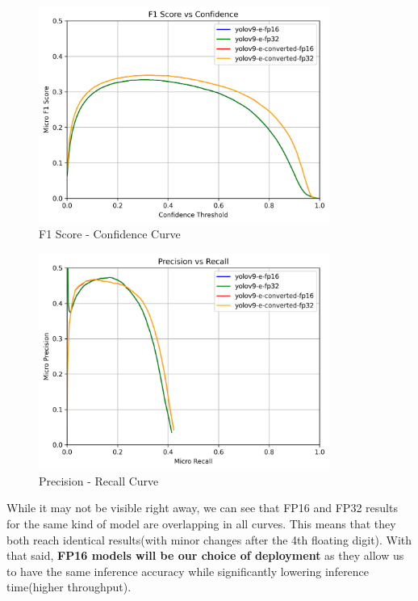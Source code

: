 \documentclass[
]{article}
\begin{document}
\begin{figure}[H]

{\centering \includegraphics[width=3.75in,height=\textheight,keepaspectratio]{../images/f1_score_confidence_curve.png}

}

\caption{F1 Score - Confidence Curve}

\end{figure}%

\begin{figure}[H]

{\centering \includegraphics[width=3.75in,height=\textheight,keepaspectratio]{../images/precision_recall_curve.png}

}

\caption{Precision - Recall Curve}

\end{figure}%

While it may not be visible right away, we can see that FP16 and FP32
results for the same kind of model are overlapping in all curves. This
means that they both reach identical results(with minor changes after
the 4th floating digit). \newline With that said, \textbf{FP16 models
will be our choice of deployment} as they allow us to have the same
inference accuracy while significantly lowering inference time(higher
throughput).
\end{document}
